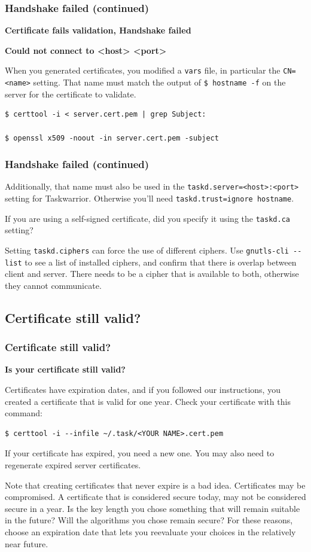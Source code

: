 \documentclass[t,handout]{beamer}
\begin{document}
\begin{frame}[fragile]\frametitle{Handshake failed (continued)}
    \vfill
    \textbf{Certificate fails validation, Handshake failed}

    \textbf{Could not connect to <host> <port>}

    When you generated certificates, you modified a \verb+vars+ file, in particular the \verb+CN=<name>+ setting. That name must match the output of  \verb+$ hostname -f+ on the server for the certificate to validate.

    \begin{lstlisting}
$ certtool -i < server.cert.pem | grep Subject:

$ openssl x509 -noout -in server.cert.pem -subject\end{lstlisting}
\end{frame}

\begin{frame}[fragile]\frametitle{Handshake failed (continued)}
    \vfill
    Additionally, that name must also be used in the \verb+taskd.server=<host>:<port>+ setting for Taskwarrior. Otherwise you'll need \verb+taskd.trust=ignore hostname+.

    If you are using a self-signed certificate, did you specify it using the \verb+taskd.ca+ setting?

    Setting \verb+taskd.ciphers+ can force the use of different ciphers. Use \verb+gnutls-cli --list+ to see a list of installed ciphers, and confirm that there is overlap between client and server. There needs to be a cipher that is available to both, otherwise they cannot communicate.
\end{frame}

\subsection{Certificate still valid?}

\begin{frame}[fragile]\frametitle{Certificate still valid?}
    \vfill
    \textbf{Is your certificate still valid?}

    Certificates have expiration dates, and if you followed our instructions, you created a certificate that is valid for one year.  Check your certificate with this command:

    \begin{lstlisting}
$ certtool -i --infile ~/.task/<YOUR NAME>.cert.pem\end{lstlisting}

    If your certificate has expired, you need a new one.  You may also need to regenerate expired server certificates.

    Note that creating certificates that never expire is a bad idea. Certificates may be compromised. A certificate that is considered secure today, may not be considered secure in a year. Is the key length you chose something that will remain suitable in the future? Will the algorithms you          chose remain secure? For these reasons, choose an expiration date that lets you reevaluate your choices in the relatively near future.
\end{frame}
\end{document}
